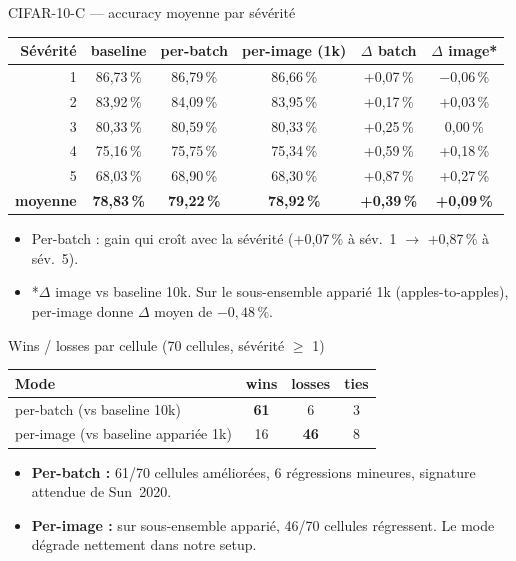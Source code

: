 \documentclass[10pt,aspectratio=169]{beamer}
\newcommand{\good}[1]{\textcolor{green!50!black}{#1}}
\newcommand{\bad}[1]{\textcolor{red!70!black}{#1}}
\begin{document}
\begin{frame}{CIFAR-10-C --- accuracy moyenne par sévérité}
  \centering
  \small
  \begin{tabular}{r|ccc|cc}
    \toprule
    Sévérité & baseline & per-batch & per-image (1k) & $\Delta$ batch & $\Delta$ image* \\
    \midrule
    1 & 86,73\,\% & 86,79\,\% & 86,66\,\% & \good{+0,07\,\%} & \bad{$-$0,06\,\%} \\
    2 & 83,92\,\% & 84,09\,\% & 83,95\,\% & \good{+0,17\,\%} & +0,03\,\% \\
    3 & 80,33\,\% & 80,59\,\% & 80,33\,\% & \good{+0,25\,\%} & 0,00\,\% \\
    4 & 75,16\,\% & 75,75\,\% & 75,34\,\% & \good{+0,59\,\%} & \good{+0,18\,\%} \\
    5 & 68,03\,\% & 68,90\,\% & 68,30\,\% & \good{+0,87\,\%} & \good{+0,27\,\%} \\
    \midrule
    \textbf{moyenne} & \textbf{78,83\,\%} & \textbf{79,22\,\%} & \textbf{78,92\,\%} & \good{\textbf{+0,39\,\%}} & \textbf{+0,09\,\%} \\
    \bottomrule
  \end{tabular}

  \vspace{0.6em}
  \begin{itemize}\footnotesize
    \item Per-batch : gain qui croît avec la sévérité (+0,07\,\% à sév.~1 $\to$ +0,87\,\% à sév.~5).
    \item *$\Delta$ image vs baseline 10k. Sur le sous-ensemble apparié 1k (apples-to-apples), per-image donne $\Delta$ moyen de \bad{$-0{,}48\,\%$}.
  \end{itemize}
\end{frame}

\begin{frame}{Wins / losses par cellule (70 cellules, sévérité $\geq$ 1)}
  \centering
  \begin{tabular}{lccc}
    \toprule
    Mode & wins & losses & ties \\
    \midrule
    per-batch (vs baseline 10k)            & \good{\textbf{61}} & 6   & 3 \\
    per-image (vs baseline appariée 1k)    & 16   & \bad{\textbf{46}} & 8 \\
    \bottomrule
  \end{tabular}

  \vspace{1em}
  \begin{itemize}
    \item \textbf{Per-batch :} 61/70 cellules améliorées, 6 régressions mineures, signature attendue de Sun~2020.
    \item \textbf{Per-image :} sur sous-ensemble apparié, 46/70 cellules régressent. Le mode dégrade nettement dans notre setup.
  \end{itemize}
\end{frame}
\end{document}
